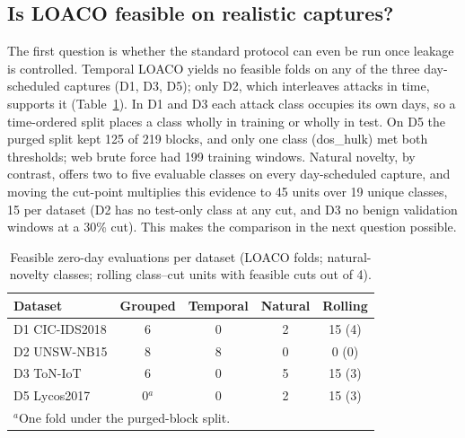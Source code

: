 \documentclass[conference]{IEEEtran}
\begin{document}
\subsection{Is LOACO feasible on realistic captures?}
\label{sec:c1}
The first question is whether the standard protocol can even be run once leakage is controlled. Temporal LOACO yields no feasible folds on any of the three day-scheduled captures (D1, D3, D5); only D2, which interleaves attacks in time, supports it (Table~\ref{tab:feas}). In D1 and D3 each attack class occupies its own days, so a time-ordered split places a class wholly in training or wholly in test. On D5 the purged split kept 125 of 219 blocks, and only one class (dos\_hulk) met both thresholds; web brute force had 199 training windows. Natural novelty, by contrast, offers two to five evaluable classes on every day-scheduled capture, and moving the cut-point multiplies this evidence to 45 units over 19 unique classes, 15 per dataset (D2 has no test-only class at any cut, and D3 no benign validation windows at a 30\% cut). This makes the comparison in the next question possible.

\begin{table}[!t]
\centering\footnotesize\setlength{\tabcolsep}{3pt}
\caption{Feasible zero-day evaluations per dataset (LOACO folds; natural-novelty classes; rolling class--cut units with feasible cuts out of 4).}
\label{tab:feas}
\begin{tabular}{lcccc}
\toprule
Dataset & Grouped & Temporal & Natural & Rolling\\
\midrule
D1 CIC-IDS2018 & 6 & 0 & 2 & 15 (4)\\
D2 UNSW-NB15 & 8 & 8 & 0 & 0 (0)\\
D3 ToN-IoT & 6 & 0 & 5 & 15 (3)\\
D5 Lycos2017 & 0$^{a}$ & 0 & 2 & 15 (3)\\
\midrule
\multicolumn{5}{l}{$^{a}$One fold under the purged-block split.}\\
\bottomrule
\end{tabular}
\end{table}
\end{document}
